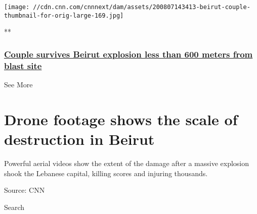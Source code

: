 \href{/videos/world/2020/08/07/beirut-explosion-survivors-lon-orig-bks.cnn/video/playlists/beirut-explosion/}{}

\texttt{[image: //cdn.cnn.com/cnnnext/dam/assets/200807143413-beirut-couple-thumbnail-for-orig-large-169.jpg]}

**

\hypertarget{couple-survives-beirut-explosion-less-than-600-meters-from-blast-site}{%
\subsubsection{\texorpdfstring{\href{/videos/world/2020/08/07/beirut-explosion-survivors-lon-orig-bks.cnn/video/playlists/beirut-explosion/}{Couple
survives Beirut explosion less than 600 meters from blast
site}}{Couple survives Beirut explosion less than 600 meters from blast site}}\label{couple-survives-beirut-explosion-less-than-600-meters-from-blast-site}}

See More

\hypertarget{drone-footage-shows-the-scale-of-destruction-in-beirut-2}{%
\section{Drone footage shows the scale of destruction in
Beirut}\label{drone-footage-shows-the-scale-of-destruction-in-beirut-2}}

Powerful aerial videos show the extent of the damage after a massive
explosion shook the Lebanese capital, killing scores and injuring
thousands.

Source: CNN

Search

